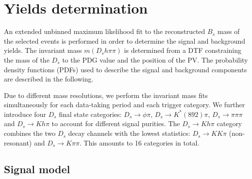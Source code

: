 
\section{Yields determination}
\label{sec:massFits}

An extended unbinned maximum likelihood fit to the reconstructed $B_s$ mass of the selected events is performed in order to determine the signal and background yields.
The invariant mass $m(D_s h \pi \pi)$ is determined from a DTF constraining the mass of the $D_s$ to the PDG value and the position of the PV. 
The probability density functions (PDFs) used to describe the signal and background components are described in the following.

Due to different mass resolutions, we perform the invariant mass fits simultaneously for each data-taking period and each trigger category. 
We further introduce four $D_s$ final state categories:
$D_s \to \phi \pi$, $D_s \to K^*(892) \pi$, $D_s \to \pi \pi \pi$ and $D_s \to K h \pi$
to account for different signal purities. 
The $D_s \to K h \pi$ category combines the two $D_s$ decay channels with the lowest statistics: $D_s \to K K \pi$ (non-resonant) and $D_s \to K \pi \pi$.
This amounts to 16 categories in total.


\subsection{Signal model}
\label{subsec:signalModel}

